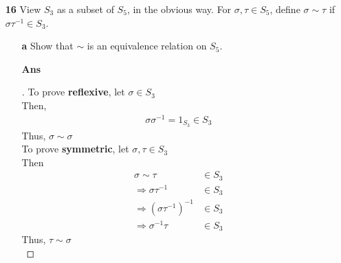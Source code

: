 \documentclass[paper=usletter, fontsize=12pt]{article}
\begin{document}
\begin{itemize}
\begin{itemize}
\begin{proof}[\unskip\nopunct]
            \end{proof}
            \vspace{0.2in}

            \item[\textbf{16}] View $S_3$ as a subset of $S_5$, in the obvious
            way. For $\sigma, \tau \in S_5$, define $\sigma \sim \tau$ if
            $\sigma\tau^{-1} \in S_3$.
            \begin{itemize}

                \item[\textbf{a}] Show that $\sim$ is an equivalence relation
                on $S_5$.
                \item[\textbf{Ans}]
                \begin{proof}[\unskip\nopunct]
                    To prove \textbf{reflexive}, let $\sigma \in S_3$\\
                    Then,
                    \begin{align*}
                        \sigma\sigma^{-1}=1_{S_3} \in S_3
                    \end{align*}
                    Thus, $\sigma \sim \sigma$\\

                    To prove \textbf{symmetric}, let $\sigma, \tau \in S_3$\\
                    Then
                    \begin{align*}
                        \sigma \sim \tau & \in S_3\\
                        \Rightarrow \sigma\tau^{-1} & \in S_3\\
                        \Rightarrow (\sigma\tau^{-1})^{-1} & \in S_3\\
                        \Rightarrow \sigma^{-1}\tau & \in S_3
                    \end{align*}
                    Thus, $\tau \sim \sigma$\\


\end{proof}
\end{itemize}
\end{itemize}
\end{itemize}
\end{document}

